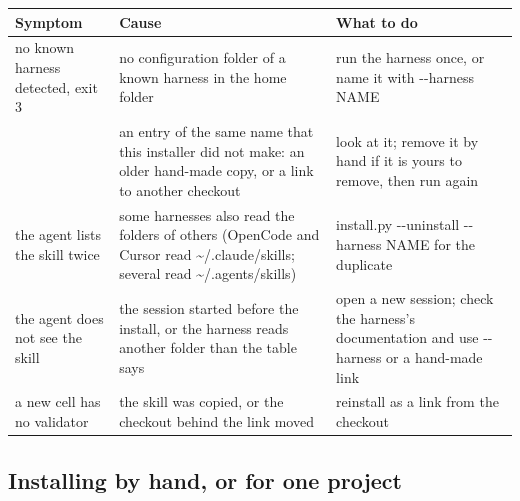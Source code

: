 \documentclass[
  american,
  10pt,
]{report}
\newcounter{none} %
\renewcommand{\texttt}[1]{{\ttfamily\hyphenchar\font=-1 #1}}
\begin{document}
{\def\LTcaptype{none} %
\begin{longtable}[]{@{}
  >{\raggedright\arraybackslash}p{}
  >{\raggedright\arraybackslash}p{}
  >{\raggedright\arraybackslash}p{}@{}}
\toprule\noalign{}
\begin{minipage}[b]{\linewidth}\raggedright
Symptom
\end{minipage} & \begin{minipage}[b]{\linewidth}\raggedright
Cause
\end{minipage} & \begin{minipage}[b]{\linewidth}\raggedright
What to do
\end{minipage} \\
\midrule\noalign{}
\endhead
\bottomrule\noalign{}
\endlastfoot
\texttt{no known harness detected}, exit 3 & no configuration folder of
a known harness in the home folder & run the harness once, or name it
with \texttt{-\allowbreak{}-\allowbreak{}harness NAME} \\
\texttt{conflict:\allowbreak{} .\allowbreak{}.\allowbreak{}.\allowbreak{} exists and was not installed by this script}
& an entry of the same name that this installer did not make: an older
hand-made copy, or a link to another checkout & look at it; remove it by
hand if it is yours to remove, then run again \\
the agent lists the skill twice & some harnesses also read the folders
of others (OpenCode and Cursor read
\texttt{\textasciitilde{}/\allowbreak{}.\allowbreak{}claude/\allowbreak{}skills};
several read
\texttt{\textasciitilde{}/\allowbreak{}.\allowbreak{}agents/\allowbreak{}skills})
&
\texttt{install.\allowbreak{}py -\allowbreak{}-\allowbreak{}uninstall -\allowbreak{}-\allowbreak{}harness NAME}
for the duplicate \\
the agent does not see the skill & the session started before the
install, or the harness reads another folder than the table says & open
a new session; check the harness's documentation and use
\texttt{-\allowbreak{}-\allowbreak{}harness} or a hand-made link \\
a new cell has no validator & the skill was copied, or the checkout
behind the link moved & reinstall as a link from the checkout \\
\end{longtable}
}

\subsection{Installing by hand, or for one
project}\label{installing-by-hand-or-for-one-project}
\end{document}

